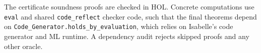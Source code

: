 \documentclass[11pt,a4paper]{article}
\begin{document}
The certificate soundness proofs are checked in HOL. Concrete computations use
\texttt{eval} and shared \texttt{code\_reflect} checker code, such that the final theorems
depend on \texttt{Code\_Generator.holds\_by\_evaluation}, which relies on Isabelle's
code generator and ML runtime. A dependency audit rejects skipped proofs and
any other oracle.






\end{document}
